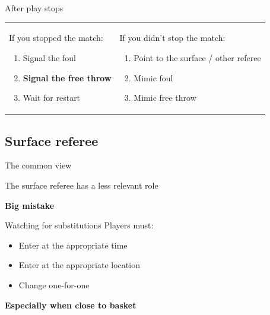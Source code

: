 \documentclass{beamer}
\begin{document}
    \begin{frame}{After play stops}
        \begin{tabular}{ll}
            \parbox{0.5\linewidth}
            {
                If you stopped the match:
                \begin{enumerate}
                    \item Signal the foul
                    \item \textbf{Signal the free throw}
                    \item Wait for restart
                \end{enumerate}

                \pause
            }
            &
            \parbox{0.5\linewidth}
            {
                If you didn't stop the match:
                \begin{enumerate}
                    \item Point to the surface / other referee
                    \item Mimic foul
                    \item Mimic free throw
                \end{enumerate}
            }
        \end{tabular}
    \end{frame}

    \subsection{Surface referee}

    \begin{frame}{The common view}
        \begin{center}
        The surface referee has a less relevant role \pause

        \textbf{Big mistake}
        \end{center}
    \end{frame}

    \begin{frame}{Watching for substitutions}
        Players must:
        \begin{itemize}
            \item Enter at the appropriate time
            \item Enter at the appropriate location
            \item Change one-for-one
        \end{itemize}

        \pause

        \textbf{Especially when close to basket}
    \end{frame}
\end{document}
